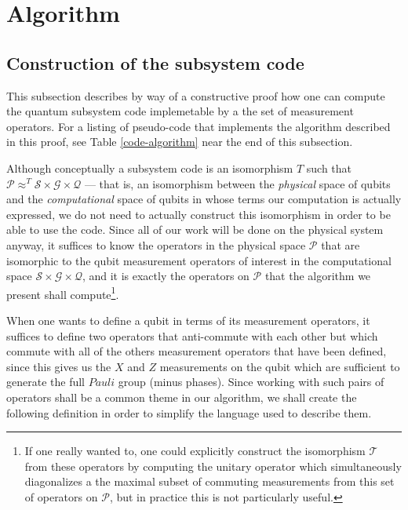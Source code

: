 \documentclass[twocolumn,showpacs,preprintnumbers,amsmath,amssymb,nofootinbib,pra,floatfix]{revtex4}
\newenvironment{remark}[1][Remark]{\begin{trivlist}
\item[\hskip \labelsep {\bfseries #1}]}{\end{trivlist}}
\begin{document}
\section{Algorithm}

\subsection{Construction of the subsystem code}

\begin{remark}
This subsection describes by way of a constructive proof how one can compute the quantum subsystem code implemetable by a the set of measurement operators.  For a listing of pseudo-code that implements the algorithm described in this proof, see Table \ref{code-algorithm} near the end of this subsection.
\end{remark}
Although conceptually a subsystem code is an isomorphism $T$ such that  $\mathscr{P}\approx^T \mathscr{S}\times\mathscr{G}\times\mathscr{Q}$ --- that is, an isomorphism between the \emph{physical} space of qubits and the \emph{computational} space of qubits in whose terms our computation is actually expressed, we do not need to actually construct this isomorphism in order to be able to use the code.  Since all of our work will be done on the physical system anyway, it suffices to know the operators in the physical space $\mathscr{P}$ that are isomorphic to the qubit measurement operators of interest in the computational space $\mathscr{S}\times\mathscr{G}\times\mathscr{Q}$, and it is exactly the operators on $\mathscr{P}$ that the algorithm we present shall compute\footnote{If one really wanted to, one could explicitly construct the isomorphism $\mathscr{T}$ from these operators by computing the unitary operator which simultaneously diagonalizes a the maximal subset of commuting measurements from this set of operators on $\mathscr{P}$, but in practice this is not particularly useful.}.

When one wants to define a qubit in terms of its measurement operators, it suffices to define two operators that anti-commute with each other but which commute with all of the others measurement operators that have been defined, since this gives us the $X$ and $Z$ measurements on the qubit which are sufficient to generate the full $Pauli$ group (minus phases).  Since working with such pairs of operators shall be a common theme in our algorithm, we shall create the following definition in order to simplify the language used to describe them.
\end{document}
